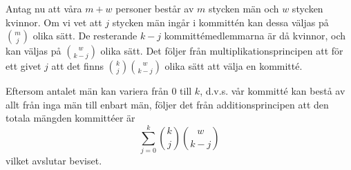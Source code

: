 \documentclass{article}
\begin{document}
Antag nu att våra $m + w$ personer består av $m$ stycken män och $w$ stycken kvinnor. Om vi vet att $j$ stycken män ingår i kommittén kan dessa väljas på $m \choose j$ olika sätt. De resterande $k - j$ kommittémedlemmarna är då kvinnor, och kan väljas på $w \choose k - j$ olika sätt. Det följer från multiplikationsprincipen att för ett givet $j$ att det finns ${k \choose j}{w \choose k - j}$ olika sätt att välja en kommitté. 

Eftersom antalet män kan variera från $0$ till $k$, d.v.s. vår kommitté kan bestå av allt från inga män till enbart män, följer det från additionsprincipen att den totala mängden kommittéer är 
$$\sum_{j=0}^{k} {k \choose j} {w \choose k - j}$$
vilket avslutar beviset. 
\end{document}
